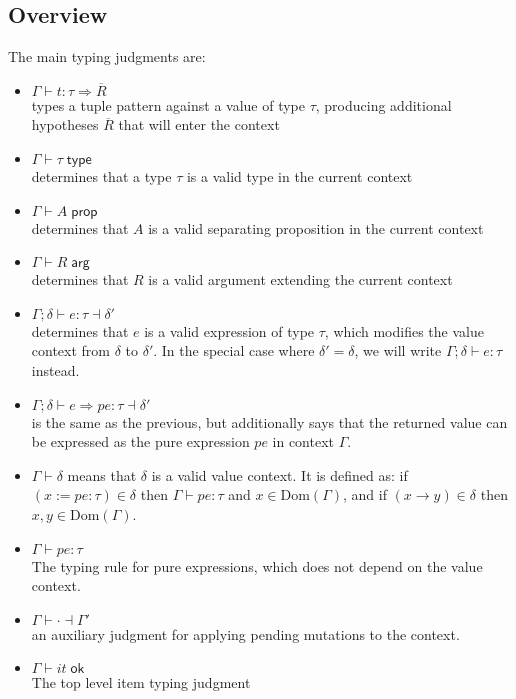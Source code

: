 \documentclass[acmsmall,nonacm]{acmart}
\newcommand{\proves}{\vdash}
\newcommand{\makes}{\dashv}
\newcommand{\constep}{\proves\cdot\makes}
\begin{document}
\subsection{Overview}

The main typing judgments are:

\begin{itemize}
  \item $\Gamma \proves t:\tau \Rightarrow \overline{R}$\\ types a tuple pattern against a value of type $\tau$, producing additional hypotheses $\overline{R}$ that will enter the context
  \item $\Gamma \proves \tau\;\mathsf{type}$\\ determines that a type $\tau$ is a valid type in the current context
  \item $\Gamma \proves A\;\mathsf{prop}$\\ determines that $A$ is a valid separating proposition in the current context
  \item $\Gamma \proves R\;\mathsf{arg}$\\ determines that $R$ is a valid argument extending the current context
  \item $\Gamma;\delta \proves e:\tau \makes\delta'$\\ determines that $e$ is a valid expression of type $\tau$, which modifies the value context from $\delta$ to $\delta'$. In the special case where $\delta'=\delta$, we will write $\Gamma;\delta \proves e:\tau$ instead.
  \item $\Gamma;\delta \proves e\Rightarrow pe:\tau \makes\delta'$\\ is the same as the previous, but additionally says that the returned value can be expressed as the pure expression $pe$ in context $\Gamma$.
  \item $\Gamma\proves \delta$ means that $\delta$ is a valid value context.
  It is defined as: if $(x:=pe:\tau)\in\delta$ then $\Gamma\proves pe:\tau$ and $x\in\mathrm{Dom}(\Gamma)$, and if $(x\to y)\in\delta$ then $x,y\in\mathrm{Dom}(\Gamma)$.
  \item $\Gamma \proves pe:\tau$\\ The typing rule for pure expressions, which does not depend on the value context.
  \item $\Gamma \constep \Gamma'$\\ an auxiliary judgment for applying pending mutations to the context.
  \item $\Gamma\proves it\;\mathsf{ok}$\\ The top level item typing judgment
\end{itemize}
\end{document}
